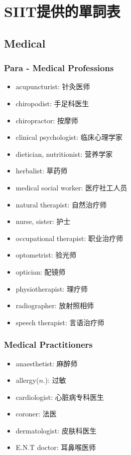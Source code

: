 \chapter{SIIT提供的單詞表}
\section{Medical}
\subsection{Para - Medical Professions}
\begin{multicols}{2}
\begin{itemize}
  \itemsep0em
  \item acupuncturist: 针灸医师
  \item chiropodist: 手足科医生
  \item chiropractor: 按摩师
  \item clinical psychologist: 临床心理学家
  \item dietician, nutritionist: 营养学家
  \item herbalist: 草药师
  \item medical social worker: 医疗社工人员
  \item natural therapist: 自然治疗师
  \item nurse, sister: 护士
  \item occupational therapist: 职业治疗师
  \item optometrist: 验光师
  \item optician: 配镜师
  \item physiotherapist: 理疗师
  \item radiographer: 放射照相师
  \item speech therapist: 言语治疗师
\end{itemize}
\end{multicols}

\subsection{Medical Practitioners}
\begin{multicols}{2}
\begin{itemize}
  \itemsep0em
  \item anaesthetist: 麻醉师
  \item allergy($n.$): 过敏
  \item cardiologist: 心脏病专科医生
  \item coroner: 法医
  \item dermatologist: 皮肤科医生
  \item E.N.T doctor: 耳鼻喉医师
\end{itemize}
\end{multicols}

